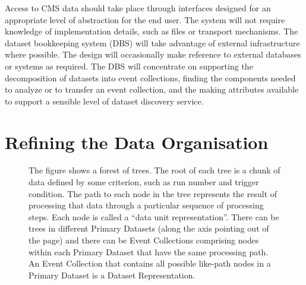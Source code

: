 \documentclass{cmspaper}
\begin{document}
Access to CMS data should take place through interfaces designed for an 
appropriate level of abstraction for the end user.  The system will not require 
knowledge of implementation details, such as files or transport mechanisms. 
The dataset bookkeeping system (DBS) will take advantage of external infrastructure where 
possible.  The design will occasionally make 
reference to external databases or systems as required.  The DBS will 
concentrate on supporting the decomposition of datasets into event collections, 
finding the 
components needed to analyze or to transfer an event collection, and the making 
attributes available to support a sensible level of dataset discovery service.  



\section{Refining the Data Organisation}

\begin{figure}[hbtp]
  \begin{center}
    \caption{The figure shows a forest of trees.  The root of each tree is a 
chunk of data defined by some criterion, such as run number and trigger condition.
The path to each node in the tree represents the result of processing that 
data through a particular sequence of processing steps.  Each node is called 
a ``data unit representation''.  There can be trees in different Primary Datasets (along the 
axis pointing out of the page) and there can be Event Collections comprising nodes 
within each Primary Dataset that have the same processing path. An Event Collection 
that contains all possible like-path nodes in a Primary Dataset is a Dataset 
Representation.}
    \label{fig:forest}
  \end{center}
\end{figure}
\end{document}
